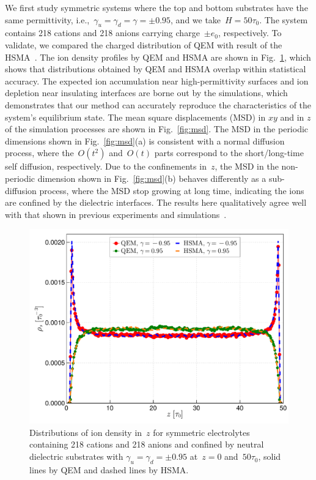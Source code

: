 We first study symmetric systems where the top and bottom substrates have the same permittivity, i.e.,~$\gamma_u = \gamma_d = \gamma = \pm 0.95$, and we take~$H = 50 \tau_0$.
The system contains 218 cations and 218 anions carrying charge~$\pm e_0$, respectively.
To validate, we compared the charged distribution of QEM with result of the HSMA~\cite{liang2020harmonic}.
The ion density profiles by QEM and HSMA are shown in Fig.~\ref{fig:MD}, which shows that distributions obtained by QEM and HSMA overlap within statistical accuracy. 
The expected ion accumulation near high-permittivity surfaces and ion depletion near insulating interfaces are borne out by the simulations, which demonstrates that our method can accurately reproduce the characteristics of the system's equilibrium state.
The mean square displacements (MSD) in $xy$ and in $z$ of the simulation processes are shown in Fig.~\ref{fig:msd}.
The MSD in the periodic dimensions shown in Fig.~\ref{fig:msd}(a) is consistent with a normal diffusion process, where the~$O(t^2)$ and~$O(t)$ parts correspond to the short/long-time self diffusion, respectively.
Due to the confinements in~$z$, the MSD in the non-periodic dimension shown in Fig.~\ref{fig:msd}(b) behaves differently as a sub-diffusion process, where the MSD stop growing at long time, indicating the ions are confined by the dielectric interfaces.
The results here qualitatively agree well with that shown in previous experiments and simulations~\cite{das2010single, neusius2009subdiffusion}.

\begin{figure}[htbp]
    \centering
    \includegraphics[width = 0.8 \linewidth]{figs/compare_HSMA.pdf}
    \caption{
        Distributions of ion density in~$z$ for symmetric electrolytes containing 218 cations and 218 anions and confined by neutral dielectric substrates with $\gamma_u = \gamma_d = \pm 0.95$ at~$z = 0$ and~$50\tau_0$, solid lines by QEM and dashed lines by HSMA.
    }
    \label{fig:MD}
\end{figure}

